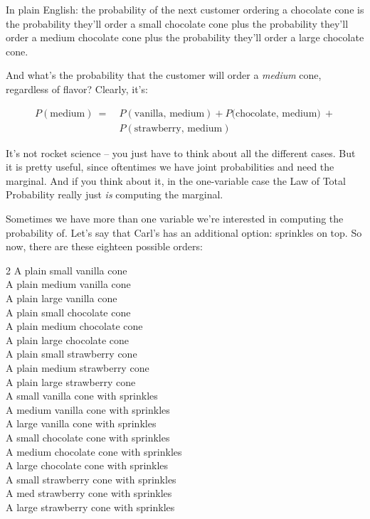 In plain English: the probability of the next customer ordering a chocolate
cone is the probability they'll order a small chocolate cone plus the
probability they'll order a medium chocolate cone plus the probability they'll
order a large chocolate cone.

And what's the probability that the customer will order a \textit{medium} cone,
regardless of flavor? Clearly, it's:

\vspace{-.2in}
\begin{align*}
P(\textrm{medium})\ =\ & P(\textrm{vanilla, medium}) + P(\textrm{chocolate,
medium)}\ +\\ &P(\textrm{strawberry, medium})
\end{align*}
\vspace{-.2in}

It's not rocket science -- you just have to think about all the different
cases. But it is pretty useful, since oftentimes we have joint probabilities
and need the marginal. And if you think about it, in the one-variable case the
Law of Total Probability really just \textit{is} computing the marginal.

Sometimes we have more than one variable we're interested in computing the
probability of. Let's say that Carl's has an additional option: sprinkles on
top. So now, there are these eighteen possible orders:

\vspace{-.1in}
\begin{center}
\begin{multicols}{2}
\scriptsize
A plain small vanilla cone \\
A plain medium vanilla cone \\
A plain large vanilla cone \\
A plain small chocolate cone \\
A plain medium chocolate cone \\
A plain large chocolate cone \\
A plain small strawberry cone \\
A plain medium strawberry cone \\
A plain large strawberry cone \\
\columnbreak
A small vanilla cone with sprinkles\\
A medium vanilla cone with sprinkles\\
A large vanilla cone with sprinkles\\
A small chocolate cone with sprinkles\\
A medium chocolate cone with sprinkles\\
A large chocolate cone with sprinkles\\
A small strawberry cone with sprinkles\\
A med strawberry cone with sprinkles\\
A large strawberry cone with sprinkles\\
\end{multicols}
\end{center}
\vspace{-.1in}

